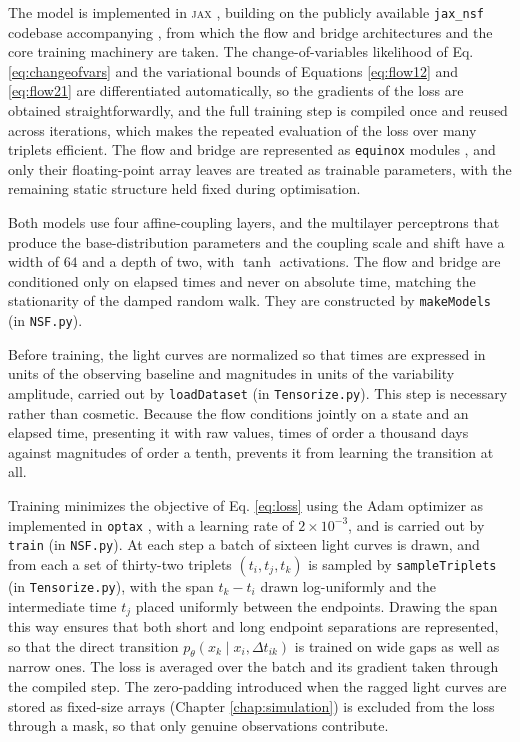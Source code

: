 The model is implemented in \textsc{jax} \parencite{JAX2018Github}, building on the publicly available \texttt{jax\_nsf} codebase accompanying \textcite{Kiyohara2025SNF}, from which the flow and bridge architectures and the core training machinery are taken. The change-of-variables likelihood of Eq. \ref{eq:changeofvars} and the variational bounds of Equations \ref{eq:flow12} and \ref{eq:flow21} are differentiated automatically, so the gradients of the loss are obtained straightforwardly, and the full training step is compiled once and reused across iterations, which makes the repeated evaluation of the loss over many triplets efficient. The flow and bridge are represented as \texttt{equinox} modules \parencite{Kidger2021Equinox}, and only their floating-point array leaves are treated as trainable parameters, with the remaining static structure held fixed during optimisation.

Both models use four affine-coupling layers, and the multilayer perceptrons that produce the base-distribution parameters and the coupling scale and shift have a width of $64$ and a depth of two, with $\tanh$ activations. The flow and bridge are conditioned only on elapsed times and never on absolute time, matching the stationarity of the damped random walk. They are constructed by \texttt{makeModels} (in \texttt{NSF.py}).

Before training, the light curves are normalized so that times are expressed in units of the observing baseline and magnitudes in units of the variability amplitude, carried out by \texttt{loadDataset} (in \texttt{Tensorize.py}). This step is necessary rather than cosmetic. Because the flow conditions jointly on a state and an elapsed time, presenting it with raw values, times of order a thousand days against magnitudes of order a tenth, prevents it from learning the transition at all.

Training minimizes the objective of Eq. \ref{eq:loss} using the Adam optimizer \parencite{Kingma2017Adam} as implemented in \texttt{optax} \parencite{Deepmind2020Optax}, with a learning rate of $2\times10^{-3}$, and is carried out by \texttt{train} (in \texttt{NSF.py}). At each step a batch of sixteen light curves is drawn, and from each a set of thirty-two triplets $(t_i, t_j, t_k)$ is sampled by \texttt{sampleTriplets} (in \texttt{Tensorize.py}), with the span $t_k - t_i$ drawn log-uniformly and the intermediate time $t_j$ placed uniformly between the endpoints. Drawing the span this way ensures that both short and long endpoint separations are represented, so that the direct transition $p_\theta(x_k \mid x_i, \Delta t_{ik})$ is trained on wide gaps as well as narrow ones. The loss is averaged over the batch and its gradient taken through the compiled step. The zero-padding introduced when the ragged light curves are stored as fixed-size arrays (Chapter \ref{chap:simulation}) is excluded from the loss through a mask, so that only genuine observations contribute.

